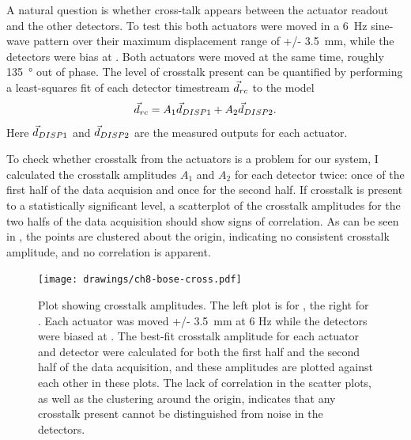 A natural question is whether cross-talk appears between the actuator readout and the other detectors.
To test this both actuators were moved in a \SI{6}{\Hz} sine-wave pattern over their maximum displacement range of +/- 3.5~mm, while the detectors were bias at \SOC.
Both actuators were moved at the same time, roughly \SI{135}{\degree} out of phase.
The level of crosstalk present can be quantified by performing a least-squares fit of each detector timestream $\vec{d}_{rc}$ to the model
\begin{equation}
	 \vec{d}_{rc} = A_1 \vec{d}_{{\small DISP{1}}} + A_2 \vec{d}_{{\small DISP{2}}}.
\end{equation}
Here $\vec{d}_{{\small DISP{1}}}$ and $\vec{d}_{{\small DISP{2}}}$ are the measured outputs for each actuator.

To check whether crosstalk from the actuators is a problem for our system, I calculated the crosstalk amplitudes $A_1$ and $A_2$ for each detector twice: once of the first half of the data acquision and once for the second half.
If crosstalk is present to a statistically significant level, a scatterplot of the crosstalk amplitudes for the two halfs of the data acquisition should show signs of correlation.
As can be seen in , the points are clustered about the origin, indicating no consistent crosstalk amplitude, and no correlation is apparent.

\begin{figure}[th]
\centering
\texttt{[image: drawings/ch8-bose-cross.pdf]}
\caption{
Plot showing crosstalk amplitudes.
The left plot is for , the right for .
Each actuator was moved +/- \SI{3.5}{\mm} at 6 Hz while the detectors were biased at \SOC.
The best-fit crosstalk amplitude for each actuator and detector were calculated for both the first half and the second half of the data acquisition, and these amplitudes are plotted against each other in these plots.
The lack of correlation in the scatter plots, as well as the clustering around the origin, indicates that any crosstalk present cannot be distinguished from noise in the detectors.
}
\label{fig:ch8-bose-cross}
\end{figure}


